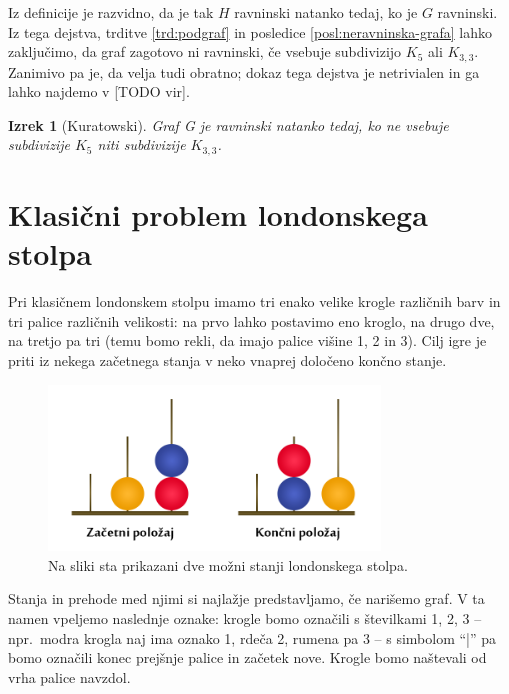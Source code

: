 \documentclass[12pt,a4paper]{amsart}
\theoremstyle{definition} %
\newtheorem{definicija}{Definicija}[section]
\theoremstyle{plain} %
\newtheorem{izrek}[definicija]{Izrek}
\newcommand{\N}{\mathbb N}
\newcommand{\graf}[1][G]{\ensuremath{#1 = (V(#1), E(#1))}}
\newcommand{\vozlisca}[1][G]{\ensuremath{V(#1)}}
\newcommand{\povezave}[1][G]{\ensuremath{E(#1)}}
\begin{document}
Iz definicije je razvidno, da je tak $H$ ravninski natanko tedaj, ko je $G$ ravninski. Iz tega dejstva, trditve \ref{trd:podgraf} in posledice \ref{posl:neravninska-grafa} lahko zaključimo, da graf zagotovo ni ravninski, če vsebuje subdivizijo $K_5$ ali $K_{3,3}$. Zanimivo pa je, da velja tudi obratno; dokaz tega dejstva je netrivialen in ga lahko najdemo v [TODO vir].

\begin{izrek}[Kuratowski]
    Graf G je ravninski natanko tedaj, ko ne vsebuje subdivizije $K_5$ niti subdivizije $K_{3,3}$.
\end{izrek}

\section{Klasični problem londonskega stolpa}
Pri klasičnem londonskem stolpu imamo tri enako velike krogle različnih barv in tri palice različnih velikosti: na prvo lahko postavimo eno kroglo, na drugo dve, na tretjo pa tri (temu bomo rekli, da imajo palice višine 1, 2 in 3). Cilj igre je priti iz nekega začetnega stanja v neko vnaprej določeno končno stanje.

\begin{figure}[h]
    \includegraphics[width=250pt]{img/london-tower.png}
    \caption{Na sliki sta prikazani dve možni stanji londonskega stolpa.}
    \label{fig:stanji}
\end{figure}

Stanja in prehode med njimi si najlažje predstavljamo, če narišemo graf. V ta namen vpeljemo naslednje oznake:
krogle bomo označili s številkami 1, 2, 3 -- npr.\ modra krogla naj ima oznako 1, rdeča 2, rumena pa 3 -- s simbolom ``|'' pa bomo označili konec prejšnje palice in začetek nove. Krogle bomo naštevali od vrha palice navzdol.
\end{document}

